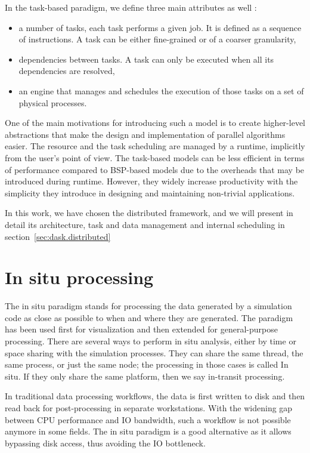 

In the task-based paradigm, we define three main attributes as well :
\begin{itemize}
    \item a number of tasks, each task performs a given job. It is defined as a sequence of instructions. A task can be either fine-grained or of a coarser granularity, 
    \item dependencies between tasks. A task can only be executed when all its dependencies are resolved,
    \item an engine that manages and schedules the execution of those tasks on a set of physical processes.
\end{itemize}

One of the main motivations for introducing such a model is to create higher-level abstractions that make the design and implementation of parallel algorithms easier. The resource and the task scheduling are managed by a runtime, implicitly from the user's point of view. The task-based models can be less efficient in terms of performance compared to BSP-based models due to the overheads that may be introduced during runtime. However, they widely increase productivity with the simplicity they introduce in designing and maintaining non-trivial applications.   

In this work, we have chosen the \dask distributed framework, and we will present in detail its architecture, task and data management and internal scheduling in section~\ref{sec:dask.distributed} 




\section{In situ processing}

The in situ paradigm stands for processing the data generated by a simulation code as close as possible to when and where they are generated. The paradigm has been used first for visualization\cite{} and then extended for general-purpose processing. There are several ways to perform in situ analysis, either by time or space sharing with the simulation processes. They can share the same thread, the same process, or just the same node; the processing in those cases is called In situ. If they only share the same platform, then we say in-transit processing.

In traditional data processing workflows, the data is first written to disk and then read back for post-processing in separate workstations. With the widening gap between CPU performance and IO bandwidth, such a workflow is not possible anymore in some fields. The in situ paradigm is a good alternative as it allows bypassing disk access, thus avoiding the IO bottleneck.  

